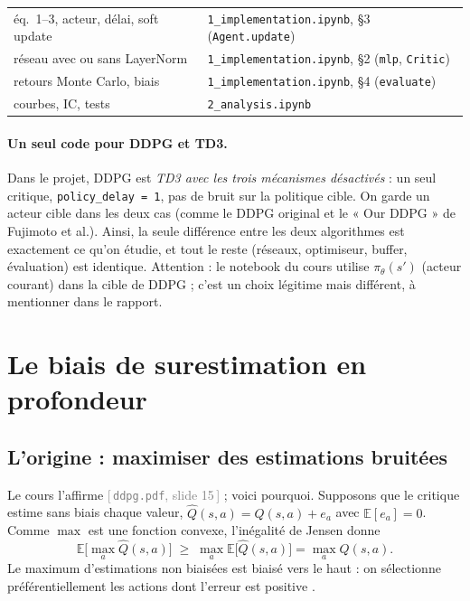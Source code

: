 \documentclass[11pt,a4paper]{article}
\newcommand{\E}{\mathbb{E}}
\newcommand{\code}[1]{\texttt{#1}}
\newcommand{\slide}[2]{\textcolor{gray}{[\,\code{#1}, slide #2\,]}}
\begin{document}
\begin{codebox}
\begin{tabular}{@{}ll@{}}
  éq.~1--3, acteur, délai, soft update & \code{1\_implementation.ipynb}, §3 (\code{Agent.update}) \\
  réseau avec ou sans LayerNorm & \code{1\_implementation.ipynb}, §2 (\code{mlp}, \code{Critic}) \\
  retours Monte Carlo, biais & \code{1\_implementation.ipynb}, §4 (\code{evaluate}) \\
  courbes, IC, tests & \code{2\_analysis.ipynb}
\end{tabular}
\end{codebox}

\paragraph{Un seul code pour DDPG et TD3.} Dans le projet, DDPG est \emph{TD3 avec les trois
mécanismes désactivés} : un seul critique, \code{policy\_delay = 1}, pas de bruit sur la politique
cible. On garde un acteur cible dans les deux cas (comme le DDPG original et le « Our DDPG » de
Fujimoto et al.). Ainsi, la seule différence entre les deux algorithmes est exactement ce qu'on
étudie, et tout le reste (réseaux, optimiseur, buffer, évaluation) est identique. Attention : le
notebook du cours utilise $\pi_\theta(s')$ (acteur courant) dans la cible de DDPG ; c'est un choix
légitime mais différent, à mentionner dans le rapport.

\section{Le biais de surestimation en profondeur}

\subsection{L'origine : maximiser des estimations bruitées}
Le cours l'affirme \slide{ddpg.pdf}{15} ; voici pourquoi. Supposons que le critique estime sans biais
chaque valeur, $\hat Q(s,a) = Q(s,a) + e_a$ avec $\E[e_a]=0$. Comme $\max$ est une fonction convexe,
l'inégalité de Jensen donne
\begin{equation}
  \E\Big[\max_a \hat Q(s,a)\Big] \;\ge\; \max_a \E\big[\hat Q(s,a)\big] = \max_a Q(s,a).
\end{equation}
Le maximum d'estimations non biaisées est biaisé vers le haut : on sélectionne préférentiellement
les actions dont l'erreur est positive \citep{thrun1993issues}.
\end{document}
